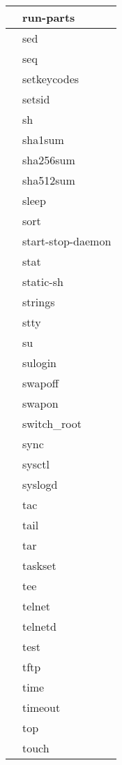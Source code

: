 \begin{longtable}{p{64mm}p{64mm}}
     \hline
      & run-parts \\
     \hline
      & sed \\
     \hline
      & seq \\
     \hline
      & setkeycodes \\
     \hline
      & setsid \\
     \hline
      & sh \\
     \hline
      & sha1sum \\
     \hline
      & sha256sum \\
     \hline
      & sha512sum \\
     \hline
      & sleep \\
     \hline
      & sort \\
     \hline
      & start-stop-daemon \\
     \hline
      & stat \\
     \hline
      & static-sh \\
     \hline
      & strings \\
     \hline
      & stty \\
     \hline
      & su \\
     \hline
      & sulogin \\
     \hline
      & swapoff \\
     \hline
      & swapon \\
     \hline
      & switch\_root \\
     \hline
      & sync \\
     \hline
      & sysctl \\
     \hline
      & syslogd \\
     \hline
      & tac \\
     \hline
      & tail \\
     \hline
      & tar \\
     \hline
      & taskset \\
     \hline
      & tee \\
     \hline
      & telnet \\
     \hline
      & telnetd \\
     \hline
      & test \\
     \hline
      & tftp \\
     \hline
      & time \\
     \hline
      & timeout \\
     \hline
      & top \\
     \hline
      & touch \\
     \hline

\end{longtable}
